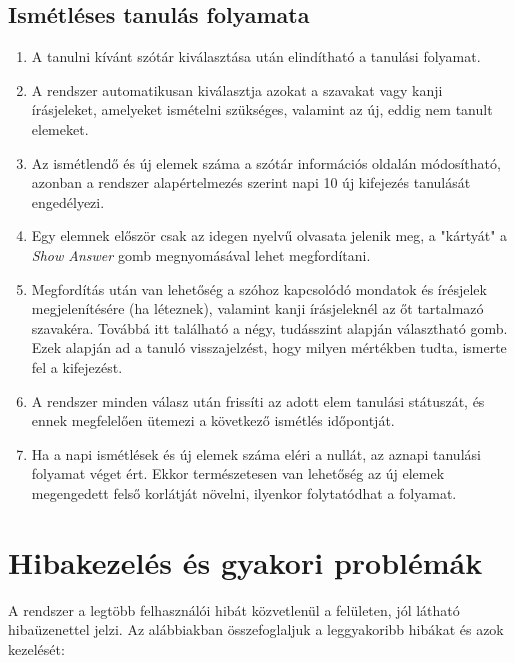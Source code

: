 \subsection{Ismétléses tanulás folyamata}

\begin{enumerate}
    \item A tanulni kívánt szótár kiválasztása után elindítható a tanulási folyamat.
    \item A rendszer automatikusan kiválasztja azokat a szavakat vagy kanji írásjeleket, amelyeket ismételni szükséges, valamint az új, eddig nem tanult elemeket.
    \item Az ismétlendő és új elemek száma a szótár információs oldalán módosítható, azonban a rendszer alapértelmezés szerint napi 10 új kifejezés tanulását engedélyezi.
    \item Egy elemnek először csak az idegen nyelvű olvasata jelenik meg, a "kártyát" a \textit{Show Answer} gomb megnyomásával lehet megfordítani.
    \item Megfordítás után van lehetőség a szóhoz kapcsolódó mondatok és írésjelek megjelenítésére (ha léteznek), valamint kanji írásjeleknél az őt tartalmazó szavakéra. Továbbá itt található a négy, tudásszint alapján választható gomb. Ezek alapján ad a tanuló visszajelzést, hogy milyen mértékben tudta, ismerte fel a kifejezést.
    \item A rendszer minden válasz után frissíti az adott elem tanulási státuszát, és ennek megfelelően ütemezi a következő ismétlés időpontját.
    \item Ha a napi ismétlések és új elemek száma eléri a nullát, az aznapi tanulási folyamat véget ért. Ekkor természetesen van lehetőség az új elemek megengedett felső korlátját növelni, ilyenkor folytatódhat a folyamat. 
\end{enumerate}

\section{Hibakezelés és gyakori problémák}

A rendszer a legtöbb felhasználói hibát közvetlenül a felületen, jól látható hibaüzenettel jelzi. Az alábbiakban összefoglaljuk a leggyakoribb hibákat és azok kezelését:

